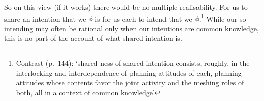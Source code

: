 \documentclass[12pt,letterpaper]{extarticle}
\begin{document}
So on this view (if it works) there would be no multiple realisability.
For us to share an intention that we $\phi$ is for us each to intend that we $\phi$.\footnote{
Contrast  (p.\ 144): `shared-ness of shared intention consists, roughly, in the interlocking and interdependence of planning attitudes of each, planning attitudes whose contents favor the joint activity and the meshing roles of both, all in a context of common knowledge'
}
While our so intending may often be rational only when our intentions are common knowledge, this is no part of the account of what shared intention is.



\small

\end{document}
